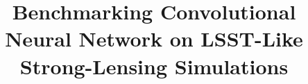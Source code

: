 \documentclass[trackchanges,twocolumn]{aastex7}
\begin{document}
\title{Benchmarking Convolutional Neural Network on LSST-Like Strong-Lensing Simulations}

\end{document}
